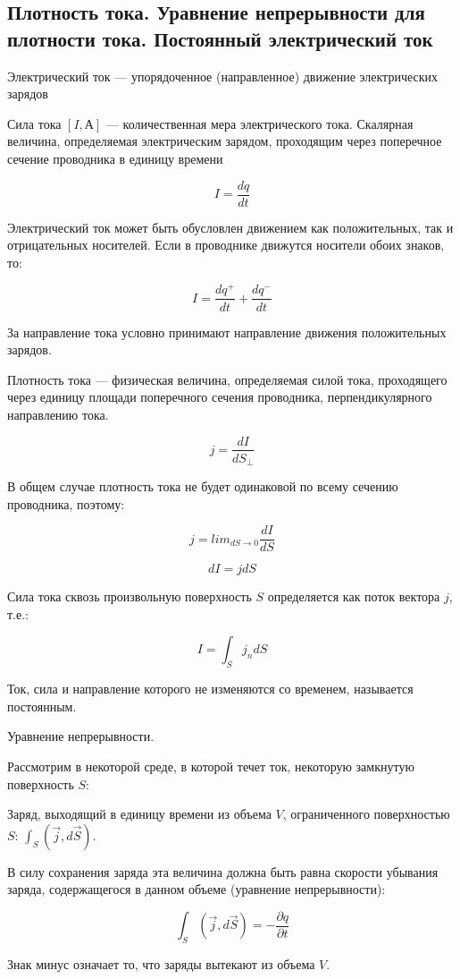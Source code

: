 \subsection{Плотность тока. Уравнение непрерывности для плотности тока. Постоянный электрический ток}

\begin{definition}
    Электрический ток — упорядоченное (направленное) движение электрических зарядов
\end{definition}

\begin{definition}
    Сила тока $[I, А]$ — количественная мера электрического тока. Скалярная величина, определяемая электрическим зарядом, 
    проходящим через поперечное сечение проводника в единицу времени

    $$
    I=\frac{dq}{dt}
    $$
\end{definition}

Электрический ток может быть обусловлен движением как положительных, так и отрицательных носителей. Если в проводнике движутся носители обоих знаков, то:

$$
I=\frac{dq^+}{dt}+\frac{dq^-}{dt}
$$

За направление тока условно принимают направление движения положительных зарядов.

\begin{definition}
Плотность тока — физическая величина, определяемая силой тока, проходящего через единицу площади поперечного сечения проводника, перпендикулярного направлению тока.

$$
j=\frac{dI}{dS_\perp}
$$    
\end{definition}

В общем случае плотность тока не будет одинаковой по всему сечению проводника, поэтому:

$$
j=lim_{dS\to0}\frac{dI}{dS}
$$

$$
dI=jdS
$$

Сила тока сквозь произвольную поверхность $S$ определяется как поток вектора $j$, т.е.:

$$
I=\int_Sj_ndS
$$

Ток, сила и направление которого не изменяются со временем, называется постоянным.

\begin{definition}
    Уравнение непрерывности.

    Рассмотрим в некоторой среде, в которой течет ток, некоторую замкнутую поверхность $S$:

    Заряд, выходящий в единицу времени из объема $V$, ограниченного поверхностью $S$:  $\displaystyle\int_S(\vec j, d\vec S)$.

    В силу сохранения заряда эта величина должна быть равна скорости убывания заряда, содержащегося в данном объеме (уравнение непрерывности):

    $$
    \int_S(\vec j,d\vec S)=-\frac{\partial q}{\partial t}
    $$

    Знак минус означает то, что заряды вытекают из объема $V$.
\end{definition}

